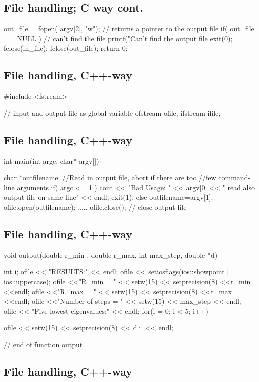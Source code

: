 \documentclass[%
oneside,                 %
final,                   %
10pt]{article}
\begin{document}
{{{{{{{{%
\subsection{File handling; C way cont.}

\bcppcod
 out_file = fopen( argv[2], "w"); // returns a pointer to the output file
 if( out_file == NULL )  {       // can't find the file
    printf("Can't find the output file%
    exit(0);
  }
  fclose(in_file);
  fclose(out_file);
  return 0;
\ecppcod

\subsection{File handling, C++-way}

\bcppcod
#include <fstream>

// input and output file as global variable
ofstream ofile;
ifstream ifile;
\ecppcod

\subsection{File handling, C++-way}

\bcppcod
int main(int argc, char* argv[])
{
  char *outfilename;
  //Read in output file, abort if there are too
  //few command-line arguments
  if( argc <= 1 ){
    cout << "Bad Usage: " << argv[0] <<
      " read also output file on same line" << endl;
    exit(1);
  }
  else{
    outfilename=argv[1];
  }
  ofile.open(outfilename);
  .....
  ofile.close();  // close output file
\ecppcod

\subsection{File handling, C++-way}

\bcppcod
void output(double r_min , double r_max, int max_step,
            double *d)
{
int i;
ofile << "RESULTS:" << endl;
ofile << setiosflags(ios::showpoint | ios::uppercase);
ofile <<"R_min = " << setw(15) << setprecision(8) <<r_min <<endl;
ofile <<"R_max = " << setw(15) << setprecision(8) <<r_max <<endl;
ofile <<"Number of steps = " << setw(15) << max_step << endl;
ofile << "Five lowest eigenvalues:" << endl;
for(i = 0; i < 5; i++) {
    ofile << setw(15) << setprecision(8) << d[i] << endl;

}  // end of function output
\ecppcod

\subsection{File handling, C++-way}

}}}}}}}}}}
\end{document}
